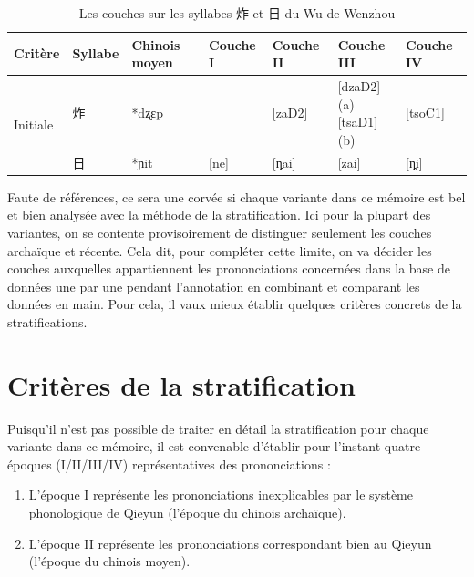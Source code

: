 \documentclass{scrbook}
\newcounter{c}[subsubsection]
\newcommand{\difwenbai}{couches archaïque et récente\xspace}
\begin{document}
\begin{sloppypar}
\begin{table}[htbp]
  \centering
    \begin{tabular}{lllllll}
    \toprule
    Critère & Syllabe & Chinois moyen  & Couche I & Couche II & Couche III & Couche IV \\
    \midrule
    \multirow{2}[2]{*}{Initiale} & 炸     & *dʐɛp &       & [zaD2] & \makecell[l]{[dzaD2] (a) \\{[tsaD1] (b)} } & [tsoC1]  \\%
          & 日     & *ɲit  & [ne]  & [ȵai] & [zai] & [ȵi] \\
    \bottomrule
    \end{tabular}%
  \caption{Les couches sur les syllabes 炸 et 日 du Wu de Wenzhou}
  \label{tab:exemple_couche_Wenzhou}%
\end{table}%

Faute de références, ce sera une corvée si chaque variante dans ce mémoire est bel et bien analysée avec la méthode de la stratification. Ici pour la plupart des variantes, on se contente provisoirement de distinguer seulement les \difwenbai. Cela dit, pour compléter cette limite, on va décider les couches auxquelles appartiennent les prononciations concernées dans la base de données une par une pendant l'annotation en combinant et comparant les données en main. Pour cela, il vaux mieux établir quelques critères concrets de la stratifications.

\chapter{Critères de la stratification}\label{critr_strat}
Puisqu'il n'est pas possible de traiter en détail la stratification pour chaque variante dans ce mémoire, il est convenable d'établir pour l'instant quatre époques (I/II/III/IV) représentatives des prononciations : 

\begin{enumerate}
\item{L'époque I représente les prononciations inexplicables par le système phonologique de Qieyun (l'époque du chinois archaïque).}

\item{L'époque II représente les prononciations correspondant bien au Qieyun (l'époque du chinois moyen).}


\end{enumerate}
\end{sloppypar}
\end{document}
